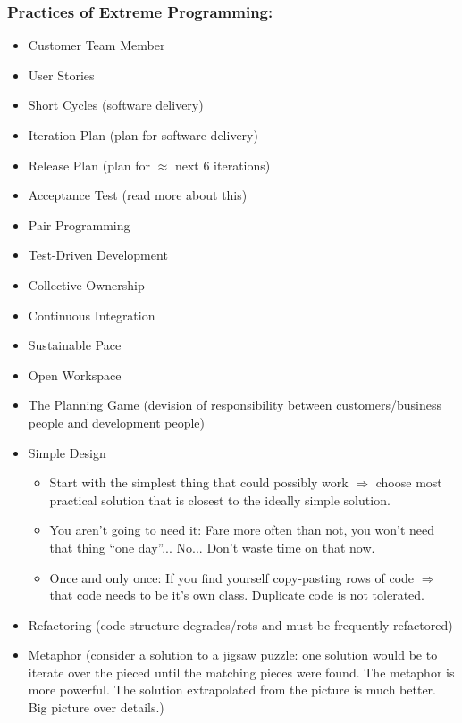 \documentclass[11pt]{amsart}
\begin{document}
\subsubsection{Practices of Extreme Programming:}
\begin{itemize}
\item Customer Team Member
\item User Stories
\item Short Cycles (software delivery)
\item Iteration Plan (plan for software delivery)
\item Release Plan (plan for $\approx$ next 6 iterations)
\item Acceptance Test (read more about this)
\item Pair Programming
\item Test-Driven Development
\item Collective Ownership
\item Continuous Integration
\item Sustainable Pace
\item Open Workspace
\item The Planning Game (devision of responsibility between customers/business people and development people)
\item Simple Design 
	\begin{itemize}
	\item Start with the simplest thing that could possibly work $\Rightarrow$ choose most practical solution that is closest to the ideally simple solution.
	\item You aren't going to need it: Fare more often than not, you won't need that thing ``one day''... No... Don't waste time on that now.
	\item Once and only once: If you find yourself copy-pasting rows of code $\Rightarrow$ that code needs to be it's own class. Duplicate code is not tolerated.
	\end{itemize}
\item Refactoring (code structure degrades/rots and must be frequently refactored)
\item Metaphor (consider a solution to a jigsaw puzzle: one solution would be to iterate over the pieced until the matching pieces were found. The metaphor is more powerful. The solution extrapolated from the picture is much better. Big picture over details.)
\end{itemize}
\end{document}
